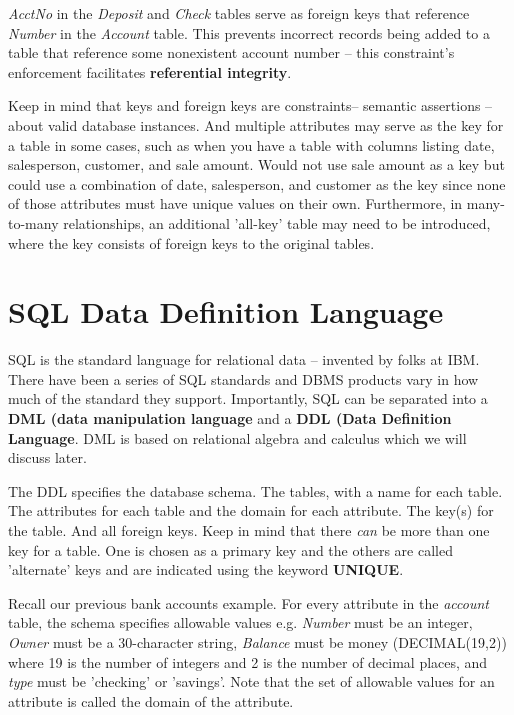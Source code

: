 \documentclass{article}
\begin{document}
\textit{AcctNo} in the \textit{Deposit} and \textit{Check} tables serve as foreign keys that reference \textit{Number} in the \textit{Account} table. This prevents incorrect records being added to a table that reference some nonexistent account number -- this constraint's enforcement facilitates \textbf{referential integrity}.

Keep in mind that keys and foreign keys are constraints-- semantic assertions -- about valid database instances. And multiple attributes may serve as the key for a table in some cases, such as when you have a table with columns listing date, salesperson, customer, and sale amount. Would not use sale amount as a key but could use a combination of date, salesperson, and customer as the key since none of those attributes must have unique values on their own. Furthermore, in many-to-many relationships, an additional 'all-key' table may need to be introduced, where the key consists of foreign keys to the original tables.

\section*{SQL Data Definition Language}
SQL is the standard language for relational data -- invented by folks at IBM. There have been a series of SQL standards and DBMS products vary in how much of the standard they support. Importantly, SQL can be separated into a \textbf{DML (data manipulation language} and a \textbf{DDL (Data Definition Language}. DML is based on relational algebra and calculus which we will discuss later. 

The DDL specifies the database schema. The tables, with a name for each table. The attributes for each table and the domain for each attribute. The key(s) for the table. And all foreign keys. Keep in mind that there \textit{can} be more than one key for a table. One is chosen as a primary key and the others are called 'alternate' keys and are indicated using the keyword \textbf{UNIQUE}.

Recall our previous bank accounts example. For every attribute in the \textit{account} table, the schema specifies allowable values e.g. \textit{Number} must be an integer, \textit{Owner} must be a 30-character string, \textit{Balance} must be money (DECIMAL(19,2)) where 19 is the number of integers and 2 is the number of decimal places, and \textit{type} must be 'checking' or 'savings'. Note that the set of allowable values for an attribute is called the domain of the attribute.
\end{document}
